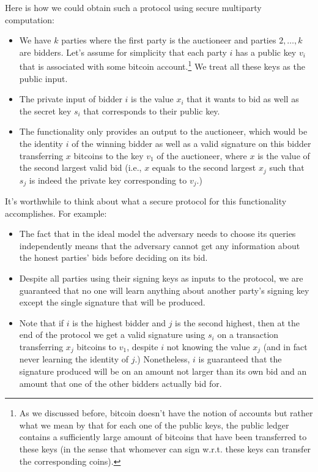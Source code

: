 Here is how we could obtain such a protocol using secure multiparty
computation:

\begin{itemize}
\item
  We have \(k\) parties where the first party is the auctioneer and
  parties \(2,\ldots,k\) are bidders. Let's assume for simplicity that
  each party \(i\) has a public key \(v_i\) that is associated with some
  bitcoin account.\footnote{As we discussed before, bitcoin doesn't have
    the notion of accounts but rather what we mean by that for each one
    of the public keys, the public ledger contains a sufficiently large
    amount of bitcoins that have been transferred to these keys (in the
    sense that whomever can sign w.r.t. these keys can transfer the
    corresponding coins).} We treat all these keys as the public input.
\item
  The private input of bidder \(i\) is the value \(x_i\) that it wants
  to bid as well as the secret key \(s_i\) that corresponds to their
  public key.
\item
  The functionality only provides an output to the auctioneer, which
  would be the identity \(i\) of the winning bidder as well as a valid
  signature on this bidder transferring \(x\) bitcoins to the key
  \(v_1\) of the auctioneer, where \(x\) is the value of the second
  largest valid bid (i.e., \(x\) equals to the second largest \(x_j\)
  such that \(s_j\) is indeed the private key corresponding to \(v_j\).)
\end{itemize}

It's worthwhile to think about what a secure protocol for this
functionality accomplishes. For example:

\begin{itemize}
\item
  The fact that in the ideal model the adversary needs to choose its
  queries independently means that the adversary cannot get any
  information about the honest parties' bids before deciding on its bid.
\item
  Despite all parties using their signing keys as inputs to the
  protocol, we are guaranteed that no one will learn anything about
  another party's signing key except the single signature that will be
  produced.
\item
  Note that if \(i\) is the highest bidder and \(j\) is the second
  highest, then at the end of the protocol we get a valid signature
  using \(s_i\) on a transaction transferring \(x_j\) bitcoins to
  \(v_1\), despite \(i\) not knowing the value \(x_j\) (and in fact
  never learning the identity of \(j\).) Nonetheless, \(i\) is
  guaranteed that the signature produced will be on an amount not larger
  than its own bid and an amount that one of the other bidders actually
  bid for.
\end{itemize}

